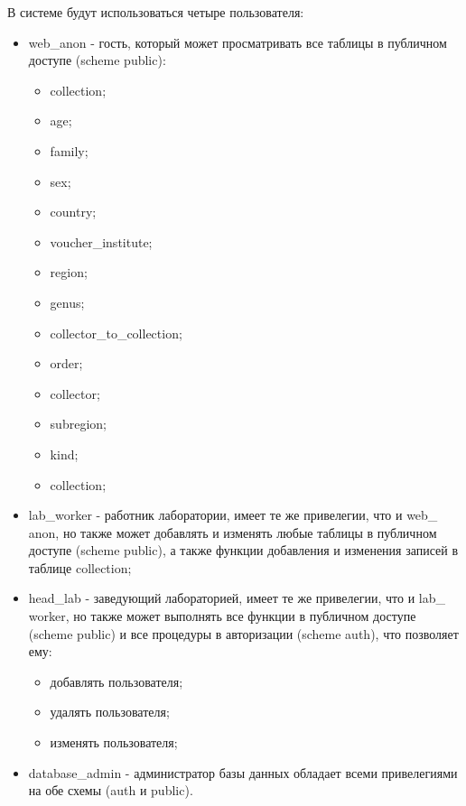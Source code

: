 \documentclass[14pt]{extarticle}
\date{\today}
\title{}
\begin{document}
В системе будут использоваться четыре пользователя:
\begin{itemize}
\item web\_​anon - гость, который может просматривать все таблицы в публичном доступе (scheme public):

\begin{itemize}
\item collection;

\item age;

\item family;

\item sex;

\item country;

\item voucher\_​institute;

\item region;

\item genus;

\item collector\_​to\_​collection;

\item order;

\item collector;

\item subregion;

\item kind;

\item collection;
\end{itemize}

\item lab\_​worker - работник лаборатории, имеет те же привелегии, что и web\_​anon,
но также может добавлять и изменять любые таблицы в публичном доступе (scheme public), а также функции добавления и изменения записей в таблице collection;

\item head\_​lab - заведующий лабораторией, имеет те же привелегии, что и lab\_​worker,
но также может выполнять все функции в публичном доступе (scheme public) и
все процедуры в авторизации (scheme auth), что позволяет ему:

\begin{itemize}
\item добавлять пользователя;

\item удалять пользователя;

\item изменять пользователя;
\end{itemize}

\item database\_​admin - администратор базы данных обладает всеми привелегиями на обе схемы (auth и public).
\end{itemize}
\end{document}

